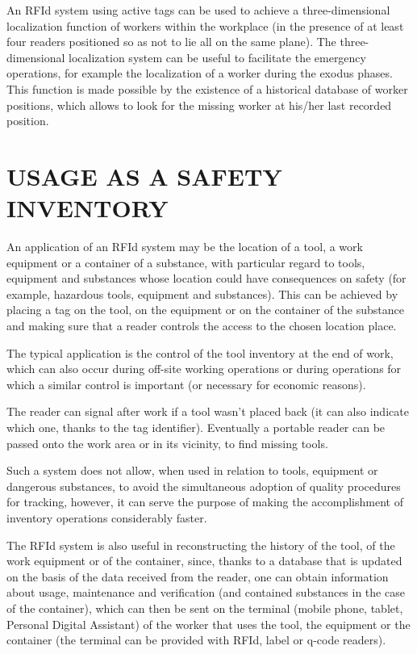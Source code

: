 \vspace*{1pc}
An RFId system using active tags can be used to achieve a three-dimensional localization function of workers within the workplace (in the presence of at least four readers positioned so as not to lie all on the same plane). The three-dimensional localization system can be useful to facilitate the emergency operations, for example the localization of a worker during the exodus phases. This function is made possible by the existence of a historical database of worker positions, which allows to look for the missing worker at his/her last recorded position. 

\section[USAGE AS A SAFETY INVENTORY]{\fontsize{14}{12}\selectfont USAGE AS A SAFETY INVENTORY}
 
An application of an RFId system may be the location of a tool, a work equipment or a container of a substance, with particular regard to tools, equipment and substances whose location could have consequences on safety (for example, hazardous tools, equipment and substances). This can be achieved by placing a tag on the tool, on the equipment or on the container of the substance and making sure that a reader controls the access to the chosen location place. 

\vspace*{1pc}
The typical application is the control of the tool inventory at the end of work, which can also occur during off-site working operations or during operations for which a similar control is important (or necessary for economic reasons).  

\vspace*{1pc}
The reader can signal after work if a tool wasn’t placed back (it can also indicate which one, thanks to the tag identifier). Eventually a portable reader can be passed onto the work area or in its vicinity, to find missing tools. 

\vspace*{1pc}
Such a system does not allow, when used in relation to tools, equipment or dangerous substances, to avoid the simultaneous adoption of quality procedures for tracking, however, it can serve the purpose of making the accomplishment of inventory operations considerably faster. 

\vspace*{1pc}
The RFId system is also useful in reconstructing the history of the tool, of the work equipment or of the container, since, thanks to a database that is updated on the basis of the data received from the reader, one can obtain information about usage, maintenance and verification (and contained substances in the case of the container), which can then be sent on the terminal (mobile phone, tablet, Personal Digital Assistant) of the worker that uses the tool, the equipment or the container (the terminal can be provided with RFId, label or q-code readers). 

